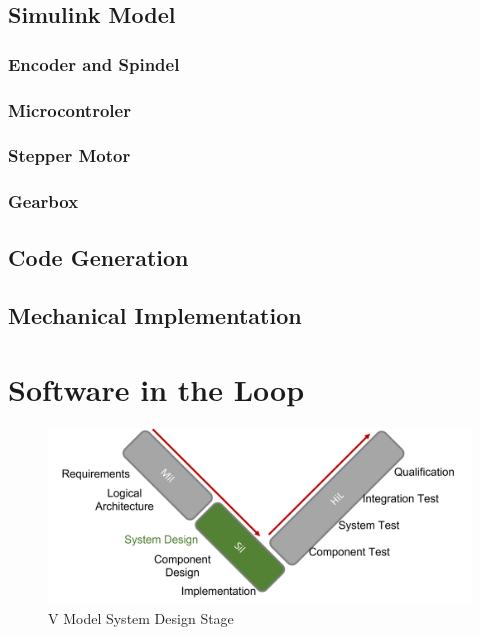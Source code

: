 \subsection{Simulink Model}
\subsubsection{Encoder and Spindel}
\subsubsection{Microcontroler}
\subsubsection{Stepper Motor}
\subsubsection{Gearbox}
\subsection{Code Generation}
\subsection{Mechanical Implementation}

\section{Software in the Loop}
\begin{figure}[h!]
    \begin{center}
    \includegraphics[width=12cm]{Pictures/V Model System Design.png}
    \caption[V Model System Design]{V Model System Design Stage}
    \label{V Model System Design}
    \end{center}
\end{figure}

